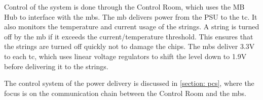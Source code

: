\documentclass[main.tex]{subfiles}
\begin{document}
Control of the system is done through the Control Room, which uses the MB Hub to interface with the \acrlong{mb}s. The \gls{mb} delivers power from the PSU to the \gls{tc}. It also monitors the temperature and current usage of the strings. A string is turned off by the \acrlong{mb} if it exceeds the current/temperature threshold. This ensures that the strings are turned off quickly not to damage the chips. The \gls{mb}s deliver 3.3V to each \gls{tc}, which uses linear voltage regulators to shift the level down to 1.9V before delivering it to the strings.

The control system of the power delivery is discussed in \autoref{section: pcs}, where the focus is on the communication chain between the Control Room and the \acrlong{mb}s.
\end{document}
